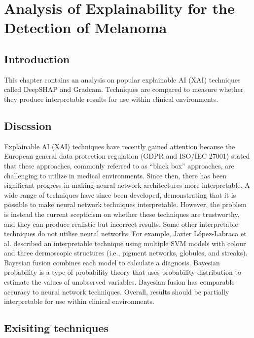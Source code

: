 \chapter{Analysis of Explainability for the Detection of Melanoma}

\section{Introduction}
This chapter contains an analysis on popular explainable AI (XAI) techniques called DeepSHAP and Gradcam. Techniques are compared to measure whether they produce interpretable results for use within clinical environments. 

\section{Discssion}
Explainable AI (XAI) techniques have recently gained attention because the European general data protection regulation (GDPR and ISO/IEC 27001) stated that these approaches, commonly referred to as ``black box'' approaches, are challenging to utilize in medical environments. Since then, there has been significant progress in making neural network architectures more interpretable. A wide range of techniques\cite{Fuji2019,  Selvaraju2016, Ribeiro2016} have since been developed, demonstrating that it is possible to make neural network techniques interpretable. However, the problem is instead the current scepticism on whether these techniques are trustworthy\cite{Tjoa2019, Samek2019a}, and they can produce realistic but incorrect results\cite{Ghorbani2019}. Some other interpretable techniques do not utilise neural networks. For example, Javier López-Labraca et al.\cite{Lopez-Labraca2018} described an interpretable technique using multiple SVM models with colour and three dermoscopic structures (i.e., pigment networks, globules, and streaks). Bayesian fusion combines each model to calculate a diagnosis. Bayesian probability is a type of probability theory that uses probability distribution to estimate the values of unobserved variables. Bayesian fusion has comparable accuracy to neural network techniques\cite{Takruri2017}. Overall, results should be partially interpretable for use within clinical environments.


\section{Exisiting techniques}

